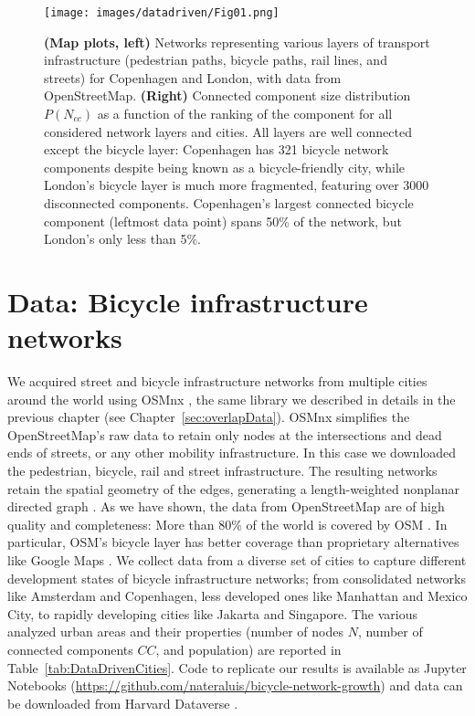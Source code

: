 \begin{figure}[th!]
  \centering
  \texttt{[image: images/datadriven/Fig01.png]}
  \caption[Multimodal configuration]{\textbf{(Map plots, left)} Networks representing various layers of transport infrastructure (pedestrian paths, bicycle paths, rail lines, and streets) for Copenhagen and London, with data from OpenStreetMap. \textbf{(Right)} Connected component size distribution $P(N_{cc})$ as a function of the ranking of the component for all considered network layers and cities. All layers are well connected except the bicycle layer: Copenhagen has 321 bicycle network components despite being known as a bicycle-friendly city, while London's bicycle layer is much more fragmented, featuring over 3000 disconnected components. Copenhagen's largest connected bicycle component (leftmost data point) spans 50\% of the network, but London's only less than 5\%.}
  \label{fig:Multimodal}
\end{figure}

\section{Data: Bicycle infrastructure networks}
We acquired street and bicycle infrastructure networks from multiple cities around the world using OSMnx \cite{boeing2017osmnx}, the same library we described in details in the previous chapter (see Chapter~\ref{sec:overlapData}). OSMnx simplifies the OpenStreetMap's raw data to retain only nodes at the intersections and dead ends of streets, or any other mobility infrastructure. In this case we downloaded the pedestrian, bicycle, rail and street infrastructure. The resulting networks retain the spatial geometry of the edges, generating a length-weighted nonplanar directed graph \cite{Boeing2020Planarity}. As we have shown, the data from OpenStreetMap are of high quality \cite{haklay2010openstreetmap,girres2010quality,Ferster2019Bicycle} and completeness: More than $80\%$ of the world is covered by OSM \cite{barbosa2018human}. In particular, OSM's bicycle layer has better coverage than proprietary alternatives like Google Maps \cite{Hochmair2012}. We collect data from a diverse set of cities to capture different development states of bicycle infrastructure networks; from consolidated networks like Amsterdam and Copenhagen, less developed ones like Manhattan and Mexico City, to rapidly developing cities like Jakarta and Singapore. The various analyzed urban areas and their properties (number of nodes $N$, number of connected components $CC$, and population) are reported in Table~\ref{tab:DataDrivenCities}. Code to replicate our results is available as Jupyter Notebooks (\url{https://github.com/nateraluis/bicycle-network-growth}) and data can be downloaded from Harvard Dataverse \cite{natera2019data}.

